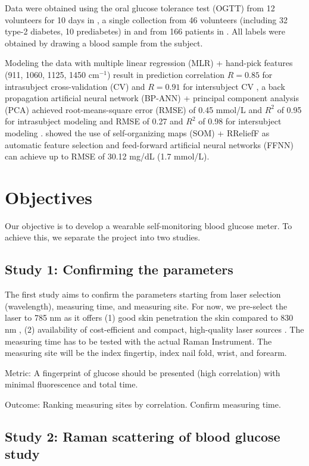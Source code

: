 Data were obtained using the oral glucose tolerance test (OGTT) from 12 volunteers for 10 days in \citep{ramanNailFold2019}, a single collection from 46 volunteers (including 32 type-2 diabetes, 10 prediabetes) in \citep{sitecompare} and from 166 patients in \citep{forearm2014}.
All labels were obtained by drawing a blood sample from the subject.

Modeling the data with multiple linear regression (MLR) + hand-pick features (911, 1060, 1125, 1450 $\text{cm}^{-1}$) result in prediction correlation $R = 0.85$ for intrasubject cross-validation (CV) and $R = 0.91$ for intersubject CV \citep{directGlucose}, a back propagation artificial neural network (BP-ANN) + principal component analysis (PCA) achieved root-means-square error (RMSE) of 0.45 mmol/L and $R^2$ of 0.95 for intrasubject modeling and RMSE of 0.27 and $R^2$ of 0.98 for intersubject modeling \citep{ramanNailFold2019}.
\cite{sitecompare} showed the use of self-organizing maps (SOM) + RReliefF as automatic feature selection and feed-forward artificial neural networks (FFNN) can achieve up to RMSE of 30.12 mg/dL (1.7 mmol/L).

\section{Objectives}

Our objective is to develop a wearable self-monitoring blood glucose meter. To achieve this, we separate the project into two studies.

\subsection{Study 1: Confirming the parameters}

The first study aims to confirm the parameters starting from laser selection (wavelength), measuring time, and measuring site.
For now, we pre-select the laser to 785 nm as it offers (1) good skin penetration the skin compared to 830 nm \citep{opticalBest}, (2) availability of cost-efficient and compact, high-quality laser sources \citep{785good}.
The measuring time has to be tested with the actual Raman Instrument.
The measuring site will be the index fingertip, index nail fold, wrist, and forearm.

Metric: A fingerprint of glucose should be presented (high correlation) with minimal fluorescence and total time.

Outcome: Ranking measuring sites by correlation. Confirm measuring time.
\subsection{Study 2: Raman scattering of blood glucose study}
\label{intro-s2}

